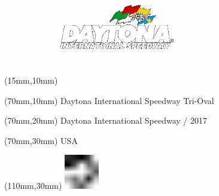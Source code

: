 \null\newpage
\begin{textblock*}{50mm}(15mm,10mm)%
\includegraphics[width=50mm]{LG/DAY.png}
\end{textblock*}
\begin{textblock*}{130mm}(70mm,10mm)%
{\fontsize{20}{20}\selectfont Daytona International Speedway Tri-Oval}\\
\end{textblock*}
\begin{textblock*}{120mm}(70mm,20mm)%
{\fontsize{16}{16}\selectfont Daytona International Speedway / 2017}\\
\end{textblock*}
\begin{textblock*}{120mm}(70mm,30mm)%
{\fontsize{12}{12}\selectfont USA}
\end{textblock*}
\begin{textblock*}{30mm}(110mm,30mm)%
\centering
\includegraphics[height=15mm]{icons/fa-rotate-left.pdf}
\end{textblock*}
